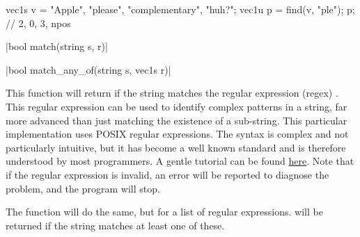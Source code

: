 \begin{example}
\begin{cppcode}
vec1s v = {"Apple", "please", "complementary", "huh?"};
vec1u p = find(v, "ple");
p; // {2, 0, 3, npos}
\end{cppcode}
\end{example}

\item \vectorfunc \cppinline|bool match(string s, r)| 

\vectorfunc \cppinline|bool match_any_of(string s, vec1s r)| 

This function will return \cpptrue if the string  matches the regular expression (regex) . This regular expression can be used to identify complex patterns in a string, far more advanced than just matching the existence of a sub-string. This particular implementation uses POSIX regular expressions. The syntax is complex and not particularly intuitive, but it has become a well known standard and is therefore understood by most programmers. A gentle tutorial can be found \href{http://www.zytrax.com/tech/web/regex.htm}{here}. Note that if the regular expression is invalid, an error will be reported to diagnose the problem, and the program will stop.

The function  will do the same, but for a list of regular expressions. \cpptrue will be returned if the string  matches at least one of these.

